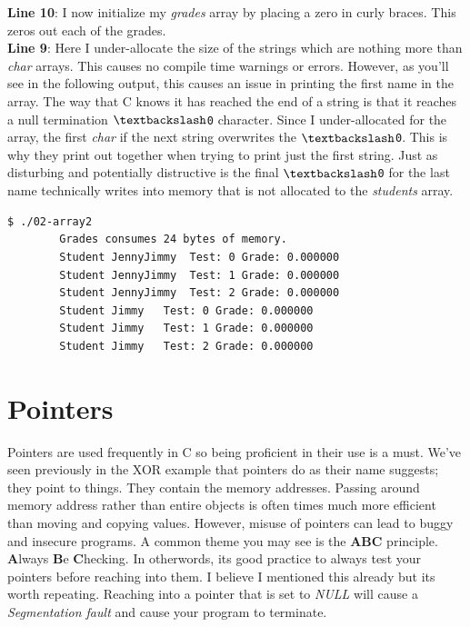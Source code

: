 \documentclass[../main.tex]{subfiles}
\begin{document}
	
	
	\textbf{Line 10}:  I now initialize my \textit{grades} array by placing a zero in curly braces.  This zeros out each of the grades.\\
	\textbf{Line 9}: Here I under-allocate the size of the strings which are nothing more than \textit{char} arrays.  This causes no compile time warnings or errors.  However, as you'll see in the following output, this causes an issue in printing the first name in the array. The way that C knows it has reached the end of a string is that it reaches a null termination \texttt{$\textbackslash$0} character.  Since I under-allocated for the array, the first \textit{char} if the next string overwrites the \texttt{$\textbackslash$0}.  This is why they print out together when trying to print just the first string.  Just as disturbing and potentially distructive is the final \texttt{$\textbackslash$0} for the last name technically writes into memory that is not allocated to the \textit{students} array.\\


	\begin{lstlisting}[language=bash, numbers=none]
		$ ./02-array2 
		Grades consumes 24 bytes of memory.
		Student JennyJimmy	Test: 0	Grade: 0.000000
		Student JennyJimmy	Test: 1	Grade: 0.000000
		Student JennyJimmy	Test: 2	Grade: 0.000000
		Student Jimmy	Test: 0	Grade: 0.000000
		Student Jimmy	Test: 1	Grade: 0.000000
		Student Jimmy	Test: 2	Grade: 0.000000
	\end{lstlisting}
	
	
	\section{Pointers}
	
	Pointers are used frequently in C so being proficient in their use is a must.  We've seen previously in the XOR example that pointers do as their name suggests; they point to things.  They contain the memory addresses.  Passing around memory address rather than entire objects is often times much more efficient than moving and copying values.  However, misuse of pointers can lead to buggy and insecure programs.  A common theme you may see is the \textbf{ABC} principle.  \textbf{A}lways \textbf{B}e \textbf{C}hecking.  In otherwords, its good practice to always test your pointers before reaching into them.  I believe I mentioned this already but its worth repeating.  Reaching into a pointer that is set to \textit{NULL} will cause a \textit{Segmentation fault} and cause your program to terminate.
	
\end{document}

